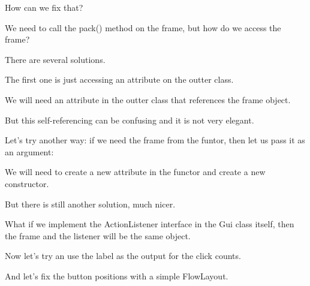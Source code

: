 \documentclass[a4paper, 9pt]{extarticle}
\begin{document}
How can we fix that?

We need to call the pack() method on the frame, but how do we access the frame?

There are several solutions.

The first one is just accessing an attribute on the outter class.

We will need an attribute in the outter class that references the frame object.


But this self-referencing can be confusing and it is not very elegant.

Let's try another way: if we need the frame from the funtor, then let us pass it as an argument:

We will need to create a new attribute in the functor and create a new constructor.


But there is still another solution, much nicer.

What if we implement the ActionListener interface in the Gui class itself, then
the frame and the listener will be the same object.


Now let's try an use the label as the output for the click counts.


And let's fix the button positions with a simple FlowLayout.

\end{document}
